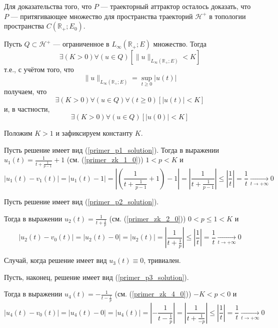 Для доказательства того, что $P$ --- траекторный аттрактор осталось доказать,
что $P$ --- притягивающее множество для пространства траекторий $\mathcal{H}^+$ в топологии пространства $C(\mathbb{R}_+; E_0)$.

Пусть $Q \subset \mathcal{H}^+$ --- ограниченное в $L_{\infty}(\mathbb{R}_+;E)$ множество.
Тогда
\begin{equation}
	\exists(K>0)\forall(u\in Q)\left[ \| u \|_{L_{\infty}(\mathbb{R}_+;E)} < K\right]
\end{equation}
т.е., с учётом того, что
$$
	\| u \|_{L_{\infty}(\mathbb{R}_+;E)} = \sup_{t\geq 0}|u(t)|
$$
получаем, что
\begin{equation}
	\exists(K>0)\forall(u\in Q)\forall(t \geq 0)\left[ | u (t) | < K\right]
\end{equation}
и, в частности,
\begin{equation}
	\exists(K>0)\forall(u\in Q)\left[ | u (0) | < K\right]
\end{equation}

Положим $K>1$ и зафиксируем  константу $K$.

Пусть решение имеет вид (\ref{primer_p1_solution}).
Тогда в выражении $u_1(t)=\frac{1}{t+\frac{1}{p-1}}+1$  (см. (\ref{primer_zk_1_0})) $1<p<K$ и
\begin{equation}
	|u_1(t) - v_1(t)| =
	|u_1(t) - 1| =
	\left|\left(\frac{1}{t+\frac{1}{p-1}}+1\right) -1\right| =
	\left|\frac{1}{t+\frac{1}{p-1}}\right| \leq
	\left|\frac{1}{t}\right| =
	\frac{1}{t}
	\xrightarrow[t\to+\infty]{}0
\end{equation}

Пусть решение имеет вид (\ref{primer_p2_solution}).

Тогда в выражении $u_2(t)=\frac{1}{t+\frac{1}{p}}$  (см. (\ref{primer_zk_2_0})) $0 < p \leq 1 < K$ и
\begin{equation}
	|u_2(t) - v_0(t)| =
	|u_2(t) - 0| =
	|u_2(t)| =
	\left| \frac{1}{t+\frac{1}{p}} \right| \leq
	\left|\frac{1}{t}\right| =
	\frac{1}{t}
	\xrightarrow[t\to+\infty]{}0
\end{equation}

Случай, когда решение имеет вид $u_3(t) \equiv 0$, тривиален.

Пусть, наконец, решение имеет вид (\ref{primer_p3_solution}).

Тогда в выражении $u_4(t)=-\frac{1}{t-\frac{1}{p}}$  (см. (\ref{primer_zk_4_0})) $-K < p < 0$ и
\begin{equation}
	|u_4(t) - v_0(t)| =
	|u_4(t) - 0| =
	|u_4(t)| =
	\left| -\frac{1}{t-\frac{1}{p}} \right| =
	\left| \frac{1}{t+\frac{1}{-p}} \right| \leq
	\left|\frac{1}{t}\right| =
	\frac{1}{t}
	\xrightarrow[t\to+\infty]{}0
\end{equation}

